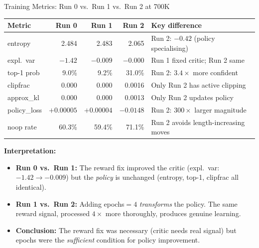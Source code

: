 \documentclass[aspectratio=169,11pt]{beamer}
\begin{document}
\begin{frame}{Training Metrics: Run 0 vs.\ Run 1 vs.\ Run 2 at 700K}
  \footnotesize
  \begin{center}
  \begin{tabular}{lrrrl}
    \toprule
    \textbf{Metric} & \textbf{Run 0} & \textbf{Run 1} & \textbf{Run 2} & \textbf{Key difference} \\
    \midrule
    entropy     & 2.484 & 2.483 & \textcolor{good}{2.065} & Run 2: $-0.42$ (policy specialising) \\
    expl.\ var  & $-1.42$ & $-0.009$ & $-0.000$ & Run 1 fixed critic; Run 2 same \\
    top-1 prob  & 9.0\% & 9.2\% & \textcolor{good}{31.0\%} & Run 2: $3.4\times$ more confident \\
    clipfrac    & 0.000 & 0.000 & 0.0016 & Only Run 2 has active clipping \\
    approx\_kl  & 0.000 & 0.000 & 0.0013 & Only Run 2 updates policy \\
    policy\_loss& $+0.00005$ & $+0.00004$ & $-0.0148$ & Run 2: $300\times$ larger magnitude \\
    noop rate   & 60.3\% & 59.4\% & 71.1\% & Run 2 avoids length-increasing moves \\
    \bottomrule
  \end{tabular}
  \end{center}

  \bigskip
  \textbf{Interpretation:}
  \begin{itemize}
    \item \textbf{Run 0 vs.\ Run 1:} The reward fix improved the critic (expl.\ var: $-1.42 \to -0.009$)
      but the \emph{policy} is unchanged (entropy, top-1, clipfrac all identical).
    \item \textbf{Run 1 vs.\ Run 2:} Adding epochs${}=4$ \emph{transforms} the policy.
      The same reward signal, processed $4\times$ more thoroughly, produces genuine learning.
    \item \textbf{Conclusion:} The reward fix was necessary (critic needs real signal)
      but epochs were the \emph{sufficient} condition for policy improvement.
  \end{itemize}
\end{frame}
\end{document}
